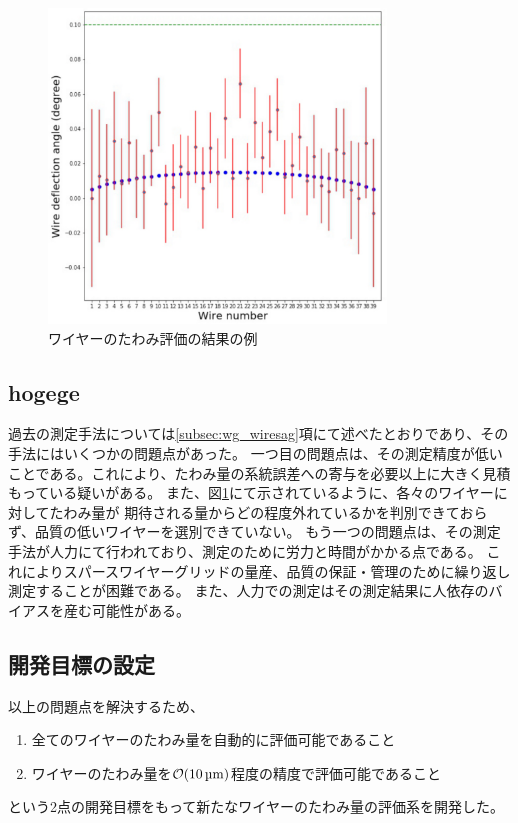 \documentclass[../../main.tex]{subfiles}
\begin{document}
\begin{figure}[H]
    \centering
    \includegraphics[width=0.8\textwidth]{wiregrid/wiresag_result_old.pdf}
    \caption{ワイヤーのたわみ評価の結果の例\cite{swg:murata}}
    \label{fig:wiresag_result_old}    
\end{figure}

\subsection{hogege}



過去の測定手法については\ref{subsec:wg_wiresag}項にて述べたとおりであり、その手法にはいくつかの問題点があった。
一つ目の問題点は、その測定精度が低いことである。これにより、たわみ量の系統誤差への寄与を必要以上に大きく見積もっている疑いがある。
また、図\ref{fig:wiresag_result_old}にて示されているように、各々のワイヤーに対してたわみ量が
期待される量からどの程度外れているかを判別できておらず、品質の低いワイヤーを選別できていない。
もう一つの問題点は、その測定手法が人力にて行われており、測定のために労力と時間がかかる点である。
これによりスパースワイヤーグリッドの量産、品質の保証・管理のために繰り返し測定することが困難である。
また、人力での測定はその測定結果に人依存のバイアスを産む可能性がある。

\subsection{開発目標の設定}
以上の問題点を解決するため、
\begin{enumerate}
    \item 全てのワイヤーのたわみ量を自動的に評価可能であること
    \item ワイヤーのたわみ量を$\order{\SI{10}{\micro m}}$程度の精度で評価可能であること
\end{enumerate}
という2点の開発目標をもって新たなワイヤーのたわみ量の評価系を開発した。
\end{document}
